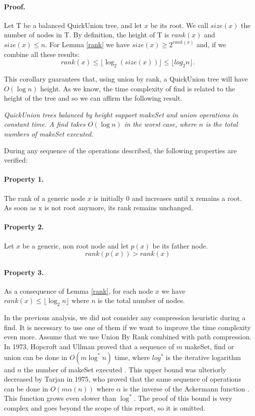 \documentclass{article}
\begin{document}
\paragraph{Proof.} Let T be a balanced QuickUnion tree, and let $x$ be its root. We call $size(x)$
the number of nodes in T. By definition, the height of T is $rank(x)$ and $size(x) \leq n$. For Lemma
\ref{rank} we have $size(x) \geq 2^{rank(x)}$ and, if we combine all these results:
$$rank(x) \leq \lfloor \log_2 (size(x))\rfloor \leq \lfloor log_2 n \rfloor.$$

\bigskip

This corollary guarantees that, using union by rank, a QuickUnion tree will have $O(\log n)$ height. As we know, the time complexity of find
is related to the height of the tree and so we can affirm the following result.

\bigskip

\emph{QuickUnion trees balanced by height support makeSet and union operations in constant time. A find takes $O(\log n)$
in the worst case, where $n$ is the total numbers of makeSet executed.}

During any sequence of the operations described, the following properties are verified:
\paragraph{Property 1.} The rank of a generic node $x$ is initially 0 and increases until x remains a root. As soon as x is not root anymore, its rank
remains unchanged.
\paragraph{Property 2.} Let $x$ be a generic, non root node and let $p(x)$ be its father node.
$$rank(p(x)) > rank(x)$$ 
\paragraph{Property 3.} As a consequence of Lemma \ref{rank}, for each node $x$ we have
$ rank(x) \leq \lfloor \log_2 n \rfloor$ where $n$ is the total number of nodes.

\bigskip

In the previous analysis, we did not  consider any compression heuristic during a find. It is necessary to use one of them if we want to improve the time complexity
even more. 
Assume that we use Union By Rank combined with path compression.
In 1973, Hopcroft and Ullman proved that a sequence of $m$ makeSet, find or  union can be done in $O(m\log^* n)$ time, where $log^*$ is the iterative
logarithm and $n$ the number of makeSet executed \cite{hopcroft1973set}. This upper bound was ulteriorly decreased by Tarjan in 1975, who proved that the same sequence of operations
can be done in $O(m\alpha(n))$ where $\alpha$ is the inverse of the Ackermann function \cite{tarjan1975efficiency}. This function grows even slower than $\log^*$.
The proof of this bound is very complex and goes beyond the scope of this report, so it is omitted.  
\end{document}
